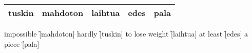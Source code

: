 \begin{center}
  \begin{tabular}{|c c c c c|}
    \hline
    tuskin & mahdoton & laihtua & edes & pala \\
    \hline
  \end{tabular}
\end{center}

\begin{questions}
  \begin{multicols}{3}
    \raggedcolumns
    \question impossible     \f[mahdoton]
    \question hardly         \f[tuskin]
    \question to lose weight \f[laihtua]
    \question at least       \f[edes]
    \question a piece        \f[pala]
  \end{multicols}
\end{questions}
